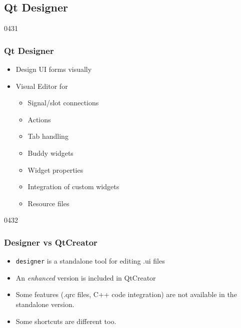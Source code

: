%
%
%
%

\subsection{Qt Designer}
\newcommand{\uicProgram}{\iConcept{uic}\xspace}

\label{qt_designer}

\begin{slide}[fragile]{0431}
\frametitle{Qt Designer}
  \begin{itemize}
\item Design UI forms visually
  \end{itemize}
  \vfill
 \begin{itemize}
 \item Visual Editor for
   \begin{itemize}
  \item Signal/slot connections
  \item Actions
  \item Tab handling
  \item Buddy widgets
  \item Widget properties
  \item Integration of custom widgets
  \item Resource files
  \end{itemize}
\end{itemize}
\end{slide}

\begin{slide}[fragile]{0432}
\frametitle{Designer vs QtCreator}

\begin{itemize}
\item {\tt designer} is a standalone tool for editing .ui files
\item An {\it enhanced} version is included in QtCreator
\item Some features (.qrc files, C++ code integration) 
    are not available in the standalone version. 
\item Some shortcuts are different too. 
\end{itemize}

\end{slide}

